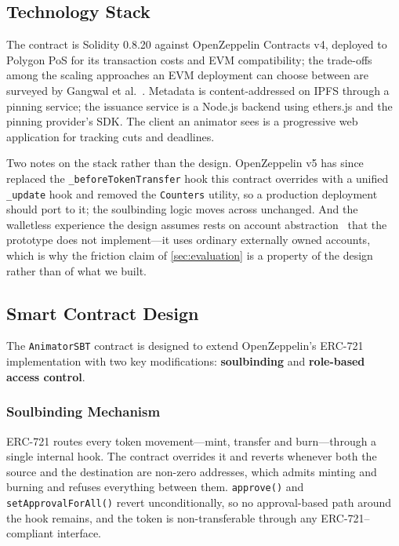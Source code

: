 
\subsection{Technology Stack}
\label{subsec:stack}

The contract is Solidity 0.8.20 against OpenZeppelin Contracts v4, deployed to
Polygon PoS for its transaction costs and EVM compatibility; the trade-offs among the
scaling approaches an EVM deployment can choose between are surveyed by Gangwal
et al.~\cite{gangwal2023layer2}. Metadata is
content-addressed on IPFS through a pinning service; the issuance service is a
Node.js backend using ethers.js and the pinning provider's SDK. The client an
animator sees is a progressive web application for tracking cuts and deadlines.

Two notes on the stack rather than the design. OpenZeppelin v5 has since replaced
the \texttt{\_beforeTokenTransfer} hook this contract overrides with a unified
\texttt{\_update} hook and removed the \texttt{Counters} utility, so a production
deployment should port to it; the soulbinding logic moves across unchanged. And
the walletless experience the design assumes rests on account abstraction~\cite{buterin2021erc4337} that the prototype does not implement---it uses ordinary externally
owned accounts, which is why the friction claim of \cref{sec:evaluation} is a
property of the design rather than of what we built.

\subsection{Smart Contract Design}
\label{subsec:contract}

The \texttt{AnimatorSBT} contract is designed to extend OpenZeppelin's ERC-721 implementation
with two key modifications: \textbf{soulbinding} and \textbf{role-based access control}.

\subsubsection{Soulbinding Mechanism}

ERC-721 routes every token movement---mint, transfer and burn---through a single
internal hook. The contract overrides it and reverts whenever both the source and the
destination are non-zero addresses, which admits minting and burning and refuses
everything between them. \texttt{approve()} and \texttt{setApprovalForAll()} revert
unconditionally, so no approval-based path around the hook remains, and the token is
non-transferable through any ERC-721--compliant interface.

